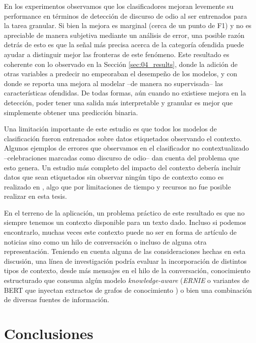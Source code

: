 En los experimentos observamos que los clasificadores mejoran levemente su performance en términos de detección de discurso de odio al ser entrenados para la tarea granular. Si bien la mejora es marginal (cerca de un punto de F1) y no es apreciable de manera subjetiva mediante un análisis de error, una posible razón detrás de esto es que la señal más precisa acerca de la categoría ofendida puede ayudar a distinguir mejor las fronteras de este fenómeno. Este resultado es coherente con lo observado en la Sección \ref{sec:04_results}, donde la adición de otras variables a predecir no empeoraban el desempeño de los modelos, y con \citet{gertner-etal-2019-mitre} donde se reporta una mejora al modelar --de manera no supervisada-- las características ofendidas. De todas formas, aún cuando no existiese mejora en la detección, poder tener una salida más interpretable y granular es mejor que simplemente obtener una predicción binaria.

Una limitación importante de este estudio es que todos los modelos de clasificación fueron entrenados sobre datos etiquetados observando el contexto. Algunos ejemplos de errores que observamos en el clasificador no contextualizado --celebraciones marcadas como discurso de odio-- dan cuenta del problema que esto genera. Un estudio más completo del impacto del contexto debería incluir datos que sean etiquetados sin observar ningún tipo de contexto como es realizado en \citet{pavlopoulos2020toxicity}, algo que por limitaciones de tiempo y recursos no fue posible realizar en esta tesis.

En el terreno de la aplicación, un problema práctico de este resultado es que no siempre tenemos un contexto disponible para un texto dado. Incluso si podemos encontrarlo, muchas veces este contexto puede no ser en forma de artículo de noticias sino como un hilo de conversación o incluso de alguna otra representación. Teniendo en cuenta alguna de las consideraciones hechas en esta discusión, una línea de investigación podría evaluar la incorporación de distintos tipos de contexto, desde más mensajes en el hilo de la conversación, conocimiento estructurado que consuma algún modelo \emph{knowledge-aware} (\emph{ERNIE} \cite{zhang2019ernie} o variantes de BERT que inyectan extractos de grafos de conocimiento \cite{liu2020kbert,faldu2021ki}) o bien una combinación de diversas fuentes de información.

\section{Conclusiones}

